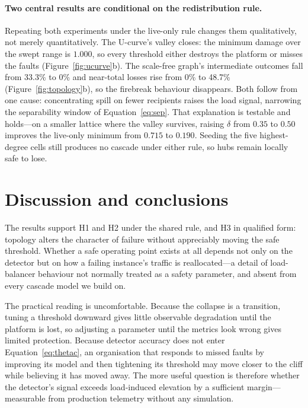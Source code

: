 \documentclass[11pt,a4paper]{article}
\begin{document}
\paragraph{Two central results are conditional on the redistribution rule.}
Repeating both experiments under the live-only rule changes them qualitatively,
not merely quantitatively. The U-curve's valley closes: the minimum damage over
the swept range is $1.000$, so every threshold either destroys the platform or
misses the faults (Figure~\ref{fig:ucurve}b). The scale-free graph's
intermediate outcomes fall from 33.3\% to 0\% and near-total losses rise from
0\% to 48.7\% (Figure~\ref{fig:topology}b), so the firebreak behaviour
disappears. Both follow from one cause: concentrating spill on fewer recipients
raises the load signal, narrowing the separability window of
Equation~\ref{eq:sep}. That explanation is testable and holds---on a smaller
lattice where the valley survives, raising $\delta$ from $0.35$ to $0.50$
improves the live-only minimum from $0.715$ to $0.190$. Seeding the five
highest-degree cells still produces no cascade under either rule, so hubs remain
locally safe to lose.

\section{Discussion and conclusions}
\label{sec:disc}

The results support H1 and H2 under the shared rule, and H3 in qualified form:
topology alters the character of failure without appreciably moving the safe
threshold. Whether a safe operating point exists at all depends not only on the
detector but on how a failing instance's traffic is reallocated---a detail of
load-balancer behaviour not normally treated as a safety parameter, and absent
from every cascade model we build on.

The practical reading is uncomfortable. Because the collapse is a transition,
tuning a threshold downward gives little observable degradation until the
platform is lost, so adjusting a parameter until the metrics look wrong gives
limited protection. Because detector
accuracy does not enter Equation~\ref{eq:thetac}, an organisation that responds
to missed faults by improving its model and then tightening its threshold may
move closer to the cliff while believing it has moved away. The more useful
question is therefore whether the detector's signal exceeds load-induced
elevation by a sufficient margin---measurable from production telemetry without
any simulation.
\end{document}

